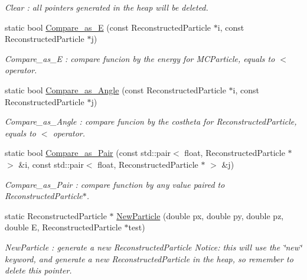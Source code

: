 \begin{DoxyCompactItemize}
\begin{DoxyCompactList}\small\item\em Clear : all pointers generated in the heap will be deleted. \item\end{DoxyCompactList}\item 
static bool \hyperlink{classToolSet_1_1CRC_a6ea8c697e4e53eabdce98971a64e38f6}{Compare\_\-as\_\-E} (const ReconstructedParticle $\ast$i, const ReconstructedParticle $\ast$j)
\begin{DoxyCompactList}\small\item\em Compare\_\-as\_\-E : compare funcion by the energy for MCParticle, equals to $<$ operator. \item\end{DoxyCompactList}\item 
static bool \hyperlink{classToolSet_1_1CRC_aa6f188da873318b014914d2872c1f7d8}{Compare\_\-as\_\-Angle} (const ReconstructedParticle $\ast$i, const ReconstructedParticle $\ast$j)
\begin{DoxyCompactList}\small\item\em Compare\_\-as\_\-Angle : compare funcion by the costheta for ReconstructedParticle, equals to $<$ operator. \item\end{DoxyCompactList}\item 
static bool \hyperlink{classToolSet_1_1CRC_a4c6c55db474f94060062b19b63ee6c65}{Compare\_\-as\_\-Pair} (const std::pair$<$ float, ReconstructedParticle $\ast$ $>$ \&i, const std::pair$<$ float, ReconstructedParticle $\ast$ $>$ \&j)
\begin{DoxyCompactList}\small\item\em Compare\_\-as\_\-Pair : compare function by any value paired to ReconstructedParticle$\ast$. \item\end{DoxyCompactList}\item 
static ReconstructedParticle $\ast$ \hyperlink{classToolSet_1_1CRC_a8d42a63101bab36be0173c2a4e101b7a}{NewParticle} (double px, double py, double pz, double E, ReconstructedParticle $\ast$test)
\begin{DoxyCompactList}\small\item\em NewParticle : generate a new ReconstructedParticle Notice: this will use the \char`\"{}new\char`\"{} keyword, and generate a new ReconstructedParticle in the heap, so remember to delete this pointer. \item\end{DoxyCompactList}\item 

\end{DoxyCompactItemize}
